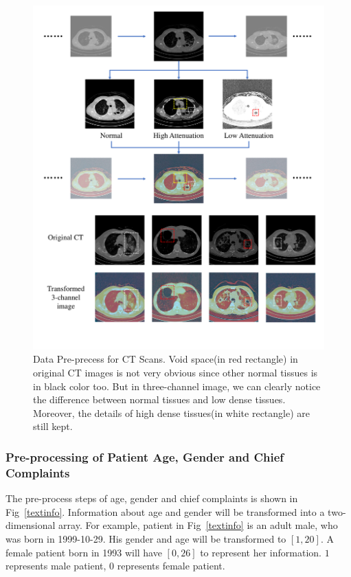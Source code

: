 \documentclass[journal]{IEEEtran}
\begin{document}
\begin{figure}[!t]
    \centerline{\includegraphics[width=150mm]{3channel.pdf}}
    \vspace{-1cm}
    \caption{Data Pre-precess for CT Scans. Void space(in red rectangle) in original CT images is not very obvious since other normal tissues is in black color too. But in three-channel image, we can clearly notice the difference between normal tissues and low dense tissues. Moreover, the details of high dense tissues(in white rectangle) are still kept. }
    \vspace{-0cm}
    \label{3channel}
    \end{figure}

\subsubsection{Pre-processing of Patient Age, Gender and Chief Complaints}
\label{textdata}
The pre-process steps of age, gender and chief complaints is shown in Fig~\ref{textinfo}. 
Information about age and gender will be transformed into a two-dimensional array. For example, patient in Fig~\ref{textinfo} is an adult male, who was born in 1999-10-29. His gender and age will be transformed to $[1, 20]$. A female patient born in 1993 will have $[0, 26]$ to represent her information. $1$ represents male patient, $0$ represents female patient. 
\end{document}
